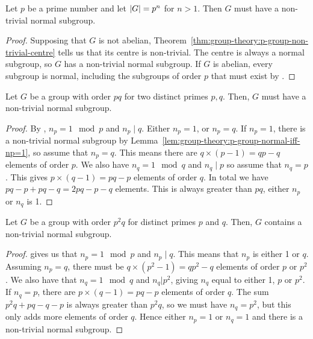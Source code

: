 \begin{lemma}
  Let \(p\) be a prime number and let \(\abs{G} = p^{n}\) for \(n > 1\). Then \(G\) must have a non-trivial normal subgroup.
\end{lemma}

\begin{proof}
  Supposing that \(G\) is not abelian, Theorem~\ref{thm:group-theory:p-group-non-trivial-centre} tells us that its centre is non-trivial. The centre is always a normal subgroup, so \(G\) has a non-trivial normal subgroup. If \(G\) is abelian, every subgroup is normal, including the subgroups of order \(p\) that must exist by .
\end{proof}

\begin{lemma}
  Let \(G\) be a group with order \(pq\) for two distinct primes \(p, q\). Then, \(G\) must have a non-trivial normal subgroup.
\end{lemma}

\begin{proof}
  By , \(n_{p} = 1 \mod p\) and \(n_{p} \mid q\). Either \(n_{p} = 1\), or \(n_{p} = q\). If \(n_{p} = 1\), there is a non-trivial normal subgroup by Lemma~\ref{lem:group-theory:p-group-normal-iff-np=1}, so assume that \(n_{p} = q\). This means there are \(q \times (p - 1) = qp - q\) elements of order \(p\). We also have \(n_{q} = 1 \mod q\) and \(n_{q} \mid p\) so assume that \(n_{q} = p\). This gives \(p \times (q -1) = pq - p\) elements of order \(q\). In total we have \(pq-p + pq-q = 2pq - p - q\) elements. This is always greater than \(pq\), either \(n_{p}\) or \(n_{q}\) is 1.
\end{proof}

\begin{lemma}
  Let \(G\) be a group with order \(p^{2}q\) for distinct primes \(p\) and \(q\). Then, \(G\) contains a non-trivial normal subgroup.
\end{lemma}

\begin{proof}
  gives us that \(n_{p} = 1 \mod p\) and \(n_{p} \mid q\). This means that \(n_{p}\) is either 1 or \(q\). Assuming \(n_{p} = q\), there must be \(q \times (p^{2}-1) = qp^{2} - q\) elements of order \(p\) or \(p^{2}\). We also have that \(n_{q} = 1 \mod q\) and \(n_{q} | p^{2}\), giving \(n_{q}\) equal to either 1, \(p\) or \(p^{2}\). If \(n_{q} = p\), there are \(p \times (q -1) = pq - p\) elements of order \(q\). The sum \(p^{2}q + pq -q -p\) is always greater than \(p^{2}q\), so we must have \(n_{q} = p^{2}\), but this only adds more elements of order \(q\). Hence either \(n_{p} =1 \) or \(n_{q} = 1\) and there is a non-trivial normal subgroup.
\end{proof}



